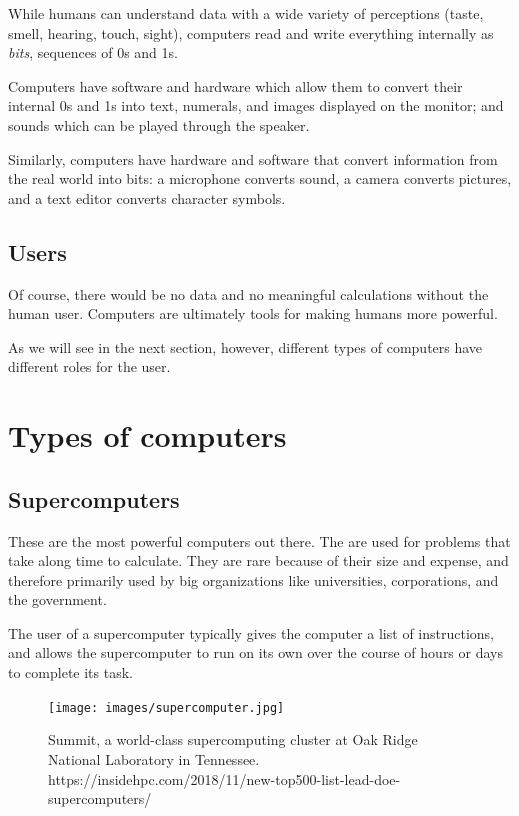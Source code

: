 While humans can understand data with a wide variety of perceptions (taste,
smell, hearing, touch, sight), computers read and write everything internally as
\textit{bits}, sequences of 0s and 1s.

Computers have software and hardware which allow them to convert their internal 0s and 1s into text, numerals, and images displayed on the monitor; and sounds which can be played through the speaker.

Similarly, computers have hardware and software that convert information from
the real world into bits: a microphone converts sound, a camera converts pictures, and a text editor converts character symbols.

\subsection{Users}
Of course, there would be no data and no meaningful calculations without the human user. Computers are ultimately tools for making humans more powerful.

As we will see in the next section, however, different types of computers have different roles for the user.


\section{Types of computers}

\subsection{Supercomputers}
These are the most powerful computers out there. The are used for problems that take along time to calculate. They are rare because of their size and expense, and therefore primarily used by big organizations like universities, corporations, and the government.

The user of a supercomputer typically gives the computer a list of instructions, and allows the supercomputer to run on its own over the course of hours or days to complete its task.

\begin{figure}
	\centering
	\texttt{[image: images/supercomputer.jpg]}
	\caption{Summit, a world-class supercomputing cluster at Oak Ridge National Laboratory in Tennessee. https://insidehpc.com/2018/11/new-top500-list-lead-doe-supercomputers/}
	\label{fig:supercomputer}
\end{figure}

